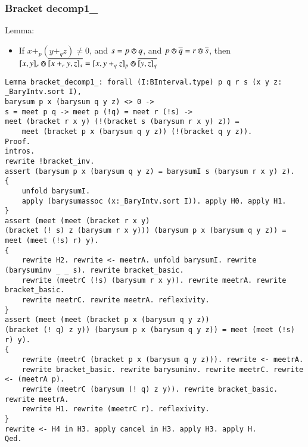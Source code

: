 \documentclass[a4paper,10pt]{article} %
\newcommand{\meet}{\circledwedge}
\begin{document}
\subsubsection{Bracket decomp1\_}
Lemma:
\begin{itemize}
    \item If $x + _p(y +_qz) \neq 0$, and $s = p \meet q$, and $p \meet \overline{q} = r \meet \overline{s}$, then $[x, y]_r \meet \overline{[x + _ry, z]_s} = [x, y +_qz]_p \meet \overline{[y, z]_q}$
\end{itemize}
\begin{lstlisting}
Lemma bracket_decomp1_: forall (I:BInterval.type) p q r s (x y z: _BaryIntv.sort I),
barysum p x (barysum q y z) <> 0 ->
s = meet p q -> meet p (!q) = meet r (!s) ->  
meet (bracket r x y) (!(bracket s (barysum r x y) z)) = 
    meet (bracket p x (barysum q y z)) (!(bracket q y z)).
Proof.
intros.
rewrite !bracket_inv. 
assert (barysum p x (barysum q y z) = barysumI s (barysum r x y) z).
{
    unfold barysumI.
    apply (barysumassoc (x:_BaryIntv.sort I)). apply H0. apply H1.
} 
assert (meet (meet (bracket r x y)
(bracket (! s) z (barysum r x y))) (barysum p x (barysum q y z)) = meet (meet (!s) r) y).
{
    rewrite H2. rewrite <- meetrA. unfold barysumI. rewrite (barysuminv _ _ s). rewrite bracket_basic.
    rewrite (meetrC (!s) (barysum r x y)). rewrite meetrA. rewrite bracket_basic. 
    rewrite meetrC. rewrite meetrA. reflexivity.
}
assert (meet (meet (bracket p x (barysum q y z))
(bracket (! q) z y)) (barysum p x (barysum q y z)) = meet (meet (!s) r) y).
{
    rewrite (meetrC (bracket p x (barysum q y z))). rewrite <- meetrA.
    rewrite bracket_basic. rewrite barysuminv. rewrite meetrC. rewrite <- (meetrA p).
    rewrite (meetrC (barysum (! q) z y)). rewrite bracket_basic. rewrite meetrA. 
    rewrite H1. rewrite (meetrC r). reflexivity.
}
rewrite <- H4 in H3. apply cancel in H3. apply H3. apply H.
Qed.
\end{lstlisting}
\end{document}
